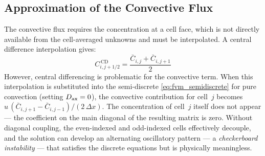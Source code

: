 \subsection{Approximation of the Convective Flux}\label{ssec:convective_flux}

The convective flux requires the concentration at a cell face, which is not directly available from the cell-averaged unknowns and must be interpolated. A central difference interpolation gives:
%
\begin{equation}
  C_{i,j+1/2}^{\,\mathrm{CD}}
  = \frac{\bar{C}_{i,j} + \bar{C}_{i,j+1}}{2}
  \label{eq:central_interp}
\end{equation}
%
However, central differencing is problematic for the convective term. When this interpolation is substituted into the semi-discrete \cref{eq:fvm_semidiscrete} for pure convection (setting \(D_{\mathrm{ax}} = 0\)), the convective contribution for cell~\(j\) becomes \(u\,(\bar{C}_{i,j+1} - \bar{C}_{i,j-1})/(2\,\Delta x)\). The concentration of cell~\(j\) itself does not appear --- the coefficient on the main diagonal of the resulting matrix is zero. Without diagonal coupling, the even-indexed and odd-indexed cells effectively decouple, and the solution can develop an alternating oscillatory pattern --- a \emph{checkerboard instability} --- that satisfies the discrete equations but is physically meaningless. 

